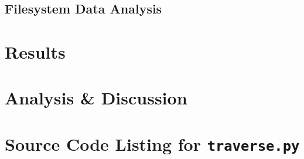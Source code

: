 \documentclass[12pt,a4paper]{article}
\begin{document}
		\subsection{Filesystem Data Analysis}
	\section{Results}
	\section{Analysis \& Discussion}
	\appendix
	\section{Source Code Listing for \texttt{traverse.py}}\label{ap:a}
		
\end{document}
